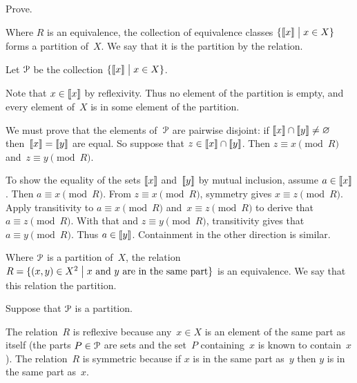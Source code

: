 \documentclass{ibl}  %
\begin{document}
\begin{problem} \label{ex:EquivClassesFormPartition}
Prove.
\begin{exes}
\begin{exercise} 
  Where $R$ is an equivalence, 
  the collection of equivalence classes 
  $\{\llbracket x \rrbracket \bigm| x\in X\}$ forms a partition of~$X$.
  We say that it is the partition  by the relation.
\end{exercise}
\begin{answer}
  Let $\EuScript{P}$ be the collection $\{\llbracket x \rrbracket \bigm| x\in X\}$.
 
  Note that $x\in\llbracket x \rrbracket$ by reflexivity.
  Thus no element of the partition is empty, and 
  every element of~$X$ is in some element of the partition.

  We must prove that the elements of~$\EuScript{P}$ are pairwise disjoint:
  if $\llbracket x \rrbracket\cap\llbracket y \rrbracket\neq\varnothing$
  then~$\llbracket x \rrbracket=\llbracket y \rrbracket$ are equal.
  So suppose that $z\in\llbracket x \rrbracket\cap\llbracket y \rrbracket$.
  Then $z\equiv x\pmod R$ and~$z\equiv y\pmod R$.

  To show the equality of the sets $\llbracket x \rrbracket$ and~$\llbracket y \rrbracket$ 
  by mutual inclusion, assume $a\in\llbracket x \rrbracket$.
  Then $a\equiv x\pmod R$.
  From $z\equiv x\pmod R$, symmetry gives $x\equiv z\pmod R$.
  Apply transitivity to $a\equiv x\pmod R$ and~$x\equiv z\pmod R$ to
  derive that $a\equiv z\pmod R$.
  With that and $z\equiv y\pmod R$, transitivity gives
  that $a\equiv y\pmod R$. 
  Thus $a\in\llbracket y \rrbracket$.
  Containment in the other direction is similar.    
\end{answer}
\begin{exercise} 
  Where $\EuScript{P}$ is a partition of~$X$, 
  the relation 
  $R=\{(x,y)\in X^2 \bigm| \text{$x$ and~$y$ are in the same part}\}$ 
  is an equivalence.
  We say that this relation  the partition. 
\end{exercise}
\begin{answer}
  Suppose that $\EuScript{P}$ is a partition. 

  The relation~$R$ is reflexive because any~$x\in X$ is an element of
  the same part as itself
  (the parts $P\in\EuScript{P}$ are sets and the set~$P$ containing~$x$
  is known to contain~$x$).
  The relation~$R$ is symmetric because if $x$ is in the same part as~$y$
  then $y$ is in the same part as~$x$.


\end{answer}
\end{exes}
\end{problem}
\end{document}
